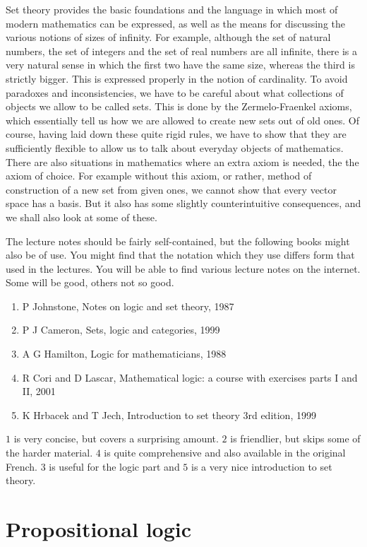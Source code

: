 Set theory provides the basic foundations and the language in which most of modern mathematics can be expressed, as well as the means for discussing the various notions of sizes of infinity. For example, although the set of natural numbers, the set of integers and the set of real numbers are all infinite, there is a very natural sense in which the first two have the same size, whereas the third is strictly bigger. This is expressed properly in the notion of cardinality. To avoid paradoxes and inconsistencies, we have to be careful about what collections of objects we allow to be called sets. This is done by the Zermelo-Fraenkel axioms, which essentially tell us how we are allowed to create new sets out of old ones. Of course, having laid down these quite rigid rules, we have to show that they are sufficiently flexible to allow us to talk about everyday objects of mathematics. There are also situations in mathematics where an extra axiom is needed, the the axiom of choice. For example without this axiom, or rather, method of construction of a new set from given ones, we cannot show that every vector space has a basis. But it also has some slightly counterintuitive consequences, and we shall also look at some of these.

The lecture notes should be fairly self-contained, but the following books might also be of use. You might find that the notation which they use differs form that used in the lectures. You will be able to find various lecture notes on the internet. Some will be good, others not so good.
\begin{enumerate}
\item P Johnstone, Notes on logic and set theory, 1987
\item P J Cameron, Sets, logic and categories, 1999
\item A G Hamilton, Logic for mathematicians, 1988
\item R Cori and D Lascar, Mathematical logic: a course with exercises parts I and II, 2001
\item K Hrbacek and T Jech, Introduction to set theory 3rd edition, 1999
\end{enumerate}
$ 1 $ is very concise, but covers a surprising amount. $ 2 $ is friendlier, but skips some of the harder material. $ 4 $ is quite comprehensive and also available in the original French. $ 3 $ is useful for the logic part and $ 5 $ is a very nice introduction to set theory.

\pagebreak

\section{Propositional logic}

